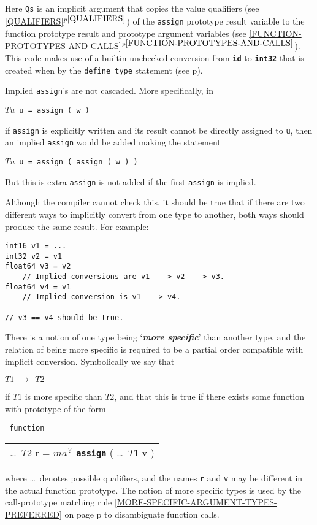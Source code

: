 \documentclass[12pt]{article}
\makeatletter
\newcommand{\TT}[1]{{\tt \bfseries #1}}
\newcommand{\mkey}[2]{{\bf \em #1}\index{#1!#2}}
\newcommand{\ttkey}[1]{\TT{#1}\index{#1@{\tt #1}}}
\newcommand{\itemref}[1]{\ref{#1}$^{p\pageref{#1}}$}
\newcommand{\pagref}[1]{p\pageref{#1}}
\newcommand{\QMARK}{{$^{\,\mbox{\footnotesize ?}}$}}
\newcommand{\CNV}{\longrightarrow}	%
\newenvironment{indpar}[1][0.3in]%
	{\begin{list}{}%
		     {\setlength{\itemsep}{0in}%
		      \setlength{\topsep}{0in}%
		      \setlength{\parsep}{1ex}%
		      \setlength{\labelwidth}{#1}%
		      \setlength{\leftmargin}{#1}%
		      \addtolength{\leftmargin}{\labelsep}}%
	 \item}%
	{\end{list}}
\makeatother
\begin{document}
Here {\tt Qs} is an implicit argument that copies the value qualifiers
(see \itemref{QUALIFIERS}) of the {\tt assign} prototype
result variable to the function
prototype result and prototype argument variables
(see \itemref{FUNCTION-PROTOTYPES-AND-CALLS}).
This code makes use of a builtin unchecked conversion from \TT{id} to \TT{int32}
that is created when by the {\tt define type} statement
(see \pagref{DEFINED-TYPE-UNCHECKED-CONVERSIONS}).

Implied {\tt assign}'s are not cascaded.  More specifically, in
\begin{center}
\tt $Tu$ u = assign ( w )
\end{center}
if {\tt assign} is explicitly written
and its result cannot be directly
assigned to {\tt u}, then an implied {\tt assign} would be added
making the statement
\begin{center}
\tt $Tu$ u = assign ( assign ( w ) )
\end{center}
But this is extra {\tt assign} is \underline{not} added
if the first {\tt assign} is implied.

Although the compiler cannot check this, it should be true
that if there are two different ways to implicitly convert from
one type to another, both ways should produce the same
result.  For example:
\begin{indpar}\begin{verbatim}
int16 v1 = ...
int32 v2 = v1
float64 v3 = v2
    // Implied conversions are v1 ---> v2 ---> v3.
float64 v4 = v1
    // Implied conversion is v1 ---> v4.

// v3 == v4 should be true.
\end{verbatim}\end{indpar}

There is a notion of one type being `\mkey{more specific}{type}' than
another type, and the relation of being more specific is required
to be a partial order compatible with implicit conversion.  Symbolically
we say that
\begin{center}
{\tt $T1~~\CNV~~T2$}
\end{center}%
\label{MORE-SPECIFIC-RELATION}
if $T1$ is more specific than $T2$, and that this is true if 
there exists some function with prototype of the form

\begin{center} \tt
function \begin{tabular}[t]{@{}l@{}}
	 \ldots{}~$T2$ r =
	 $ma$\QMARK{} \ttkey{assign}
	 ( \ldots{}~$T1$ v )
	 \end{tabular}
\end{center}
where \ldots{}~denotes possible qualifiers, and
the names {\tt r} and {\tt v} may be different
in the actual function prototype.
The notion of more specific
types is used by the
call-prototype matching rule
\ref{MORE-SPECIFIC-ARGUMENT-TYPES-PREFERRED}
on page \pagref{MORE-SPECIFIC-ARGUMENT-TYPES-PREFERRED}
to disambiguate function calls.
\end{document}
